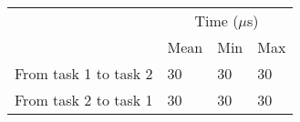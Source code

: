 \begin{tabular}{llll}
  & \multicolumn{3}{c}{Time ($\mu$s)}          \\ \cline{2-4} 
  & \multicolumn{1}{c}{Mean} & Min  & Max  \\ \cline{2-4} 
From task 1 to task 2 & 30                     & 30 & 30 \\
From task 2 to task 1 & 30                     & 30 & 30
\end{tabular}